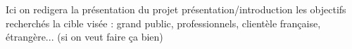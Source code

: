 Ici on redigera la présentation du projet
présentation/introduction
les objectifs recherchés
la cible visée : grand public, professionnels, clientèle française, étrangère... (si on veut faire ça bien)